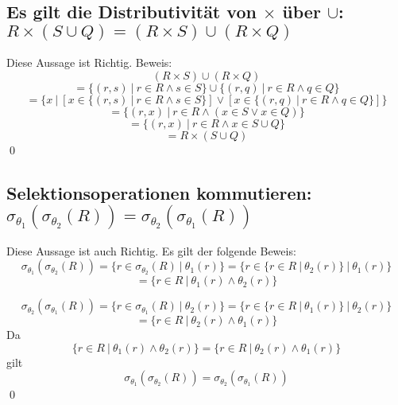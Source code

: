 \documentclass{scrartcl}
\begin{document}
\subsection{Es gilt die Distributivität von $\times$ über $\cup$:
$R \times (S \cup Q) = (R \times S) \cup (R \times Q)$}
Diese Aussage ist Richtig. Beweis:
\[(R \times S) \cup (R \times Q)\]
\[= \{(r,s)\ |\ r \in R \wedge s \in S\} \cup \{(r,q)\ |\ r \in R \wedge q \in Q\}\] 
\[ = \{x\ |\ [x \in \{(r,s)\ |\ r \in R \wedge s \in S\}] \vee [x \in \{(r,q)\ |\ r \in R \wedge q \in Q\}]\}\]
\[ = \{(r,x)\ |\ r \in R \wedge (x \in S \vee x \in Q)\}\]
\[= \{(r,x)\ |\ r \in R \wedge x \in S \cup Q\}\]
\[ = R \times (S \cup Q)\] \qed
\subsection{Selektionsoperationen kommutieren: $\sigma_{\theta_1}(\sigma_{\theta_2}(R))=\sigma_{\theta_2}(\sigma_{\theta_1}(R))$}
Diese Aussage ist auch Richtig. Es gilt der folgende Beweis:
\[\sigma_{\theta_1}(\sigma_{\theta_2}(R)) = \{r \in \sigma_{\theta_2}(R)\ |\ \theta_1(r)\} = \{r \in \{ r \in R\ |\ \theta_2(r)\}\ |\ \theta_1(r)\}\]\[ = \{r \in R\ |\ \theta_1(r) \wedge \theta_2(r)\}\]

\[\sigma_{\theta_2}(\sigma_{\theta_1}(R)) = \{r \in \sigma_{\theta_1}(R)\ |\ \theta_2(r)\} = \{r \in \{ r \in R\ |\ \theta_1(r)\}\ |\ \theta_2(r)\}\]\[ = \{r \in R\ |\ \theta_2(r) \wedge \theta_1(r)\}\]
Da \[\{r \in R\ |\ \theta_1(r) \wedge \theta_2(r)\} = \{r \in R\ |\ \theta_2(r) \wedge \theta_1(r)\}\] gilt \[\sigma_{\theta_1}(\sigma_{\theta_2}(R))=\sigma_{\theta_2}(\sigma_{\theta_1}(R)) \]\qed
\end{document}
